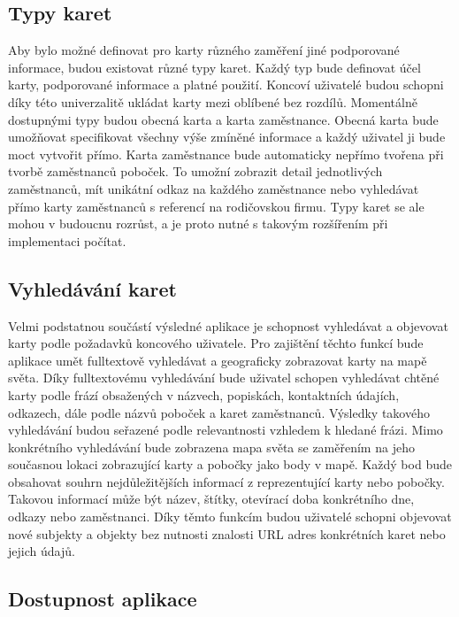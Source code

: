 	\subsection{Typy karet}

	Aby bylo možné definovat pro karty různého zaměření jiné podporované informace, budou existovat různé typy karet.
	Každý typ bude definovat účel karty, podporované informace a platné použití.
	Koncoví uživatelé budou schopni díky této univerzalitě ukládat karty mezi oblíbené bez rozdílů.
	Momentálně dostupnými typy budou obecná karta a karta zaměstnance.
	Obecná karta bude umožňovat specifikovat všechny výše zmíněné informace a každý uživatel ji bude moct vytvořit přímo.
	Karta zaměstnance bude automaticky nepřímo tvořena při tvorbě zaměstnanců poboček.
	To umožní zobrazit detail jednotlivých zaměstnanců, mít unikátní odkaz na každého zaměstnance nebo vyhledávat
	přímo karty zaměstnanců s referencí na rodičovskou firmu.
	Typy karet se ale mohou v budoucnu rozrůst, a je proto nutné s takovým rozšířením při
	implementaci počítat.

	\subsection{Vyhledávání karet}

	Velmi podstatnou součástí výsledné aplikace je schopnost vyhledávat a objevovat karty podle požadavků koncového uživatele.
	Pro zajištění těchto funkcí bude aplikace umět fulltextově vyhledávat a geograficky zobrazovat karty na mapě světa.
	Díky fulltextovému vyhledávání bude uživatel schopen vyhledávat chtěné karty podle frází obsažených v názvech,
	popiskách, kontaktních údajích, odkazech, dále podle názvů poboček a karet zaměstnanců.
	Výsledky takového vyhledávání budou seřazené podle relevantnosti vzhledem k hledané frázi.
	Mimo konkrétního vyhledávání bude zobrazena mapa světa se zaměřením na jeho současnou lokaci zobrazující
	karty a pobočky jako body v mapě.
	Každý bod bude obsahovat souhrn nejdůležitějších informací z reprezentující karty nebo pobočky.
	Takovou informací může být název, štítky, otevírací doba konkrétního dne, odkazy nebo zaměstnanci.
	Díky těmto funkcím budou uživatelé schopni objevovat nové subjekty a objekty bez nutnosti znalosti \ac{URL} adres
	konkrétních karet nebo jejich údajů.

	\subsection{Dostupnost aplikace}

